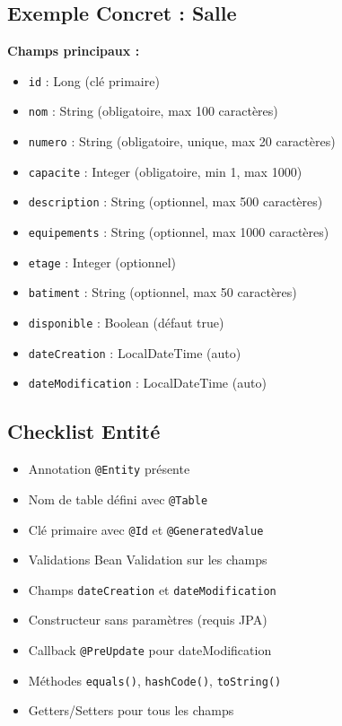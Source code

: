 \documentclass[12pt,a4paper]{article}
\begin{document}
\subsection{Exemple Concret : Salle}

\textbf{Champs principaux :}
\begin{itemize}
    \item \texttt{id} : Long (clé primaire)
    \item \texttt{nom} : String (obligatoire, max 100 caractères)
    \item \texttt{numero} : String (obligatoire, unique, max 20 caractères)
    \item \texttt{capacite} : Integer (obligatoire, min 1, max 1000)
    \item \texttt{description} : String (optionnel, max 500 caractères)
    \item \texttt{equipements} : String (optionnel, max 1000 caractères)
    \item \texttt{etage} : Integer (optionnel)
    \item \texttt{batiment} : String (optionnel, max 50 caractères)
    \item \texttt{disponible} : Boolean (défaut true)
    \item \texttt{dateCreation} : LocalDateTime (auto)
    \item \texttt{dateModification} : LocalDateTime (auto)
\end{itemize}

\subsection{Checklist Entité}

\begin{itemize}
    \item[$\square$] Annotation \texttt{@Entity} présente
    \item[$\square$] Nom de table défini avec \texttt{@Table}
    \item[$\square$] Clé primaire avec \texttt{@Id} et \texttt{@GeneratedValue}
    \item[$\square$] Validations Bean Validation sur les champs
    \item[$\square$] Champs \texttt{dateCreation} et \texttt{dateModification}
    \item[$\square$] Constructeur sans paramètres (requis JPA)
    \item[$\square$] Callback \texttt{@PreUpdate} pour dateModification
    \item[$\square$] Méthodes \texttt{equals()}, \texttt{hashCode()}, \texttt{toString()}
    \item[$\square$] Getters/Setters pour tous les champs
\end{itemize}
\end{document}
